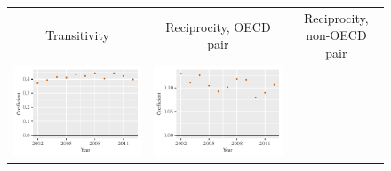\documentclass[reqno,onecolumn,letterpaper,12pt]{article}
\begin{document}
\begin{figure}[!h]
\centering
\begin{tabular}{@{\hskip -.05cm}c@{\hskip -.2cm}c@{\hskip -.2cm}c}
Transitivity  & Reciprocity, OECD pair & Reciprocity, non-OECD pair\\
\includegraphics[height=.165\textheight, clip=true, trim=.5cm .5cm 0cm .1cm]{figures/main_rl_plots/Transitivity.pdf}   &
\includegraphics[height=.165\textheight, clip=true, trim=.5cm .5cm 0cm .1cm]{figures/main_rl_plots/Mutuality_OECD.pdf}    &

\end{tabular}
\end{figure}
\end{document}
